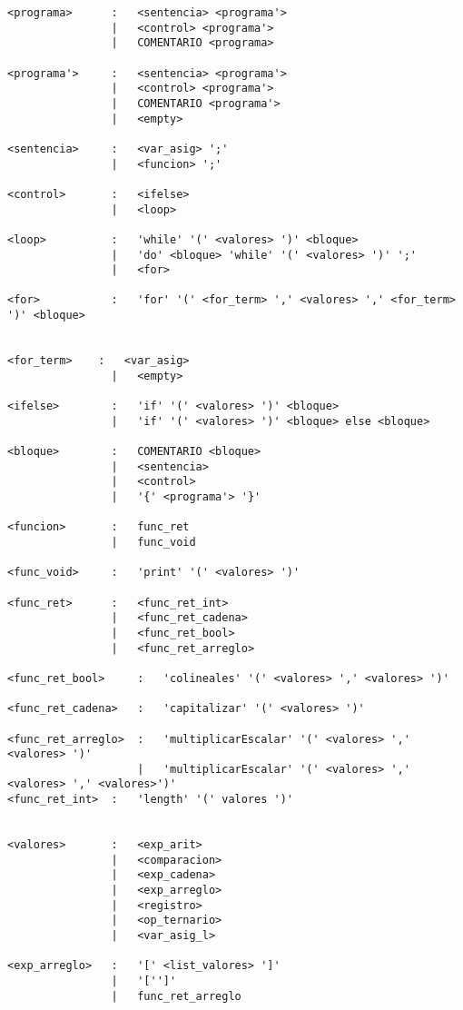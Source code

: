 \begin{verbatim}
<programa>      :   <sentencia> <programa'>   
                |   <control> <programa'>   
                |   COMENTARIO <programa>   

<programa'>     :   <sentencia> <programa'>   
                |   <control> <programa'>   
                |   COMENTARIO <programa'>   
                |   <empty>

<sentencia>     :   <var_asig> ';'
                |   <funcion> ';'

<control>       :   <ifelse>
                |   <loop>

<loop>          :   'while' '(' <valores> ')' <bloque>
                |   'do' <bloque> 'while' '(' <valores> ')' ';' 
                |   <for>
                
<for>           :   'for' '(' <for_term> ',' <valores> ',' <for_term> ')' <bloque>


<for_term>    :   <var_asig> 
                |   <empty>

<ifelse>        :   'if' '(' <valores> ')' <bloque>
                |   'if' '(' <valores> ')' <bloque> else <bloque>

<bloque>        :   COMENTARIO <bloque>
                |   <sentencia>
                |   <control>
                |   '{' <programa'> '}'

<funcion>       :   func_ret
                |   func_void

<func_void>     :   'print' '(' <valores> ')'

<func_ret>      :   <func_ret_int>
                |   <func_ret_cadena>
                |   <func_ret_bool>
                |   <func_ret_arreglo>

<func_ret_bool>     :   'colineales' '(' <valores> ',' <valores> ')'

<func_ret_cadena>   :   'capitalizar' '(' <valores> ')'

<func_ret_arreglo>  :   'multiplicarEscalar' '(' <valores> ',' <valores> ')'
                    |   'multiplicarEscalar' '(' <valores> ',' <valores> ',' <valores>')'
<func_ret_int>  :   'length' '(' valores ')'


<valores>       :   <exp_arit>
                |   <comparacion>
                |   <exp_cadena>
                |   <exp_arreglo>
                |   <registro>
                |   <op_ternario>
                |   <var_asig_l>

<exp_arreglo>   :   '[' <list_valores> ']'
                |   '['']'
                |   func_ret_arreglo


\end{verbatim}
